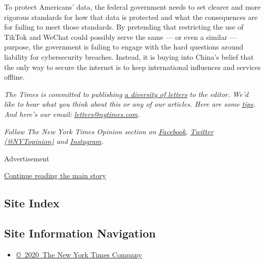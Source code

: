 To protect Americans' data, the federal government needs to set clearer
and more rigorous standards for how that data is protected and what the
consequences are for failing to meet those standards. By pretending that
restricting the use of TikTok and WeChat could possibly serve the same
--- or even a similar --- purpose, the government is failing to engage
with the hard questions around liability for cybersecurity breaches.
Instead, it is buying into China's belief that the only way to secure
the internet is to keep international influences and services offline.

\emph{The Times is committed to publishing}
\href{https://www.nytimes.com/2019/01/31/opinion/letters/letters-to-editor-new-york-times-women.html}{\emph{a
diversity of letters}} \emph{to the editor. We'd like to hear what you
think about this or any of our articles. Here are some}
\href{https://help.nytimes.com/hc/en-us/articles/115014925288-How-to-submit-a-letter-to-the-editor}{\emph{tips}}\emph{.
And here's our email:}
\href{mailto:letters@nytimes.com}{\emph{letters@nytimes.com}}\emph{.}

\emph{Follow The New York Times Opinion section on}
\href{https://www.facebook.com/nytopinion}{\emph{Facebook}}\emph{,}
\href{http://twitter.com/NYTOpinion}{\emph{Twitter (@NYTopinion)}}
\emph{and}
\href{https://www.instagram.com/nytopinion/}{\emph{Instagram}}\emph{.}

Advertisement

\protect\hyperlink{after-bottom}{Continue reading the main story}

\hypertarget{site-index}{%
\subsection{Site Index}\label{site-index}}

\hypertarget{site-information-navigation}{%
\subsection{Site Information
Navigation}\label{site-information-navigation}}

\begin{itemize}
\tightlist
\item
  \href{https://help.nytimes.com/hc/en-us/articles/115014792127-Copyright-notice}{©~2020~The
  New York Times Company}
\end{itemize}

